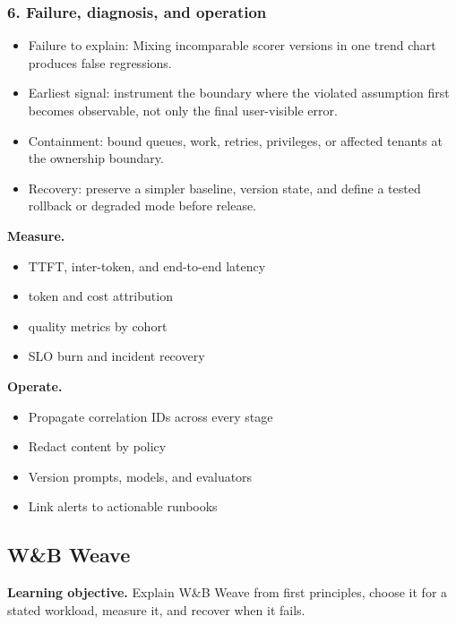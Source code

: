 \subsubsection*{6. Failure, diagnosis, and operation}
\begin{itemize}
\item Failure to explain: Mixing incomparable scorer versions in one trend chart produces false regressions.
\item Earliest signal: instrument the boundary where the violated assumption first becomes observable, not only the final user-visible error.
\item Containment: bound queues, work, retries, privileges, or affected tenants at the ownership boundary.
\item Recovery: preserve a simpler baseline, version state, and define a tested rollback or degraded mode before release.
\end{itemize}
\textbf{Measure.}\begin{itemize}
\item TTFT, inter-token, and end-to-end latency
\item token and cost attribution
\item quality metrics by cohort
\item SLO burn and incident recovery
\end{itemize}
\textbf{Operate.}\begin{itemize}
\item Propagate correlation IDs across every stage
\item Redact content by policy
\item Version prompts, models, and evaluators
\item Link alerts to actionable runbooks
\end{itemize}
\subsection{W\&B Weave}
\textbf{Learning objective.} Explain W\&B Weave from first principles, choose it for a stated workload, measure it, and recover when it fails.
